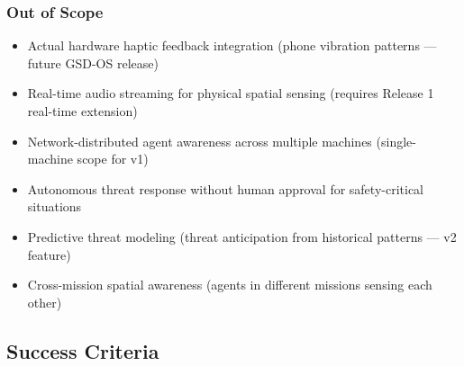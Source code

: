 \documentclass[11pt,letterpaper]{article}
\begin{document}
\subsubsection{Out of Scope}

\begin{itemize}[leftmargin=2em]
\item Actual hardware haptic feedback integration (phone vibration patterns --- future GSD-OS release)
\item Real-time audio streaming for physical spatial sensing (requires Release 1 real-time extension)
\item Network-distributed agent awareness across multiple machines (single-machine scope for v1)
\item Autonomous threat response without human approval for safety-critical situations
\item Predictive threat modeling (threat anticipation from historical patterns --- v2 feature)
\item Cross-mission spatial awareness (agents in different missions sensing each other)
\end{itemize}

\subsection{Success Criteria}
\end{document}
